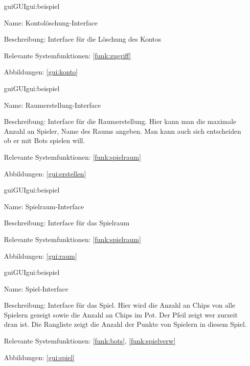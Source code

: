 \begin{description}[leftmargin=5em, style=sameline]	
	\begin{lhp}{gui}{GUI}{gui:beispiel}
		\item[Name:] Kontolöschung-Interface
		\item[Beschreibung:] Interface für die Löschung des Kontos
		\item[Relevante Systemfunktionen:] \ref{funk:zugriff}
		\item[Abbildungen:] \ref{gui:konto}
	\end{lhp}
\end{description}

\begin{description}[leftmargin=5em, style=sameline]	
	\begin{lhp}{gui}{GUI}{gui:beispiel}
		\item[Name:] Raumerstellung-Interface
		\item[Beschreibung:] Interface für die Raumerstellung. Hier kann man die maximale Anzahl an Spieler, Name des Raums angeben. Man kann auch sich entscheiden ob er mit Bots spielen will.
		\item[Relevante Systemfunktionen:] \ref{funk:spielraum}
		\item[Abbildungen:] \ref{gui:erstellen}
	\end{lhp}
\end{description}

\begin{description}[leftmargin=5em, style=sameline]	
	\begin{lhp}{gui}{GUI}{gui:beispiel}
		\item[Name:] Spielraum-Interface
		\item[Beschreibung:] Interface für das Spielraum
		\item[Relevante Systemfunktionen:] \ref{funk:spielraum}
		\item[Abbildungen:] \ref{gui:raum}
	\end{lhp}
\end{description}

\begin{description}[leftmargin=5em, style=sameline]	
	\begin{lhp}{gui}{GUI}{gui:beispiel}
		\item[Name:] Spiel-Interface
		\item[Beschreibung:] Interface für das Spiel. Hier wird die Anzahl an Chips von alle Spielern gezeigt sowie die Anzahl an Chips im Pot. Der Pfeil zeigt wer zurzeit dran ist. Die Rangliste zeigt die Anzahl der Punkte von Spielern in diesem Spiel.
		\item[Relevante Systemfunktionen:] \ref{funk:bots}, \ref{funk:spielverw}
		\item[Abbildungen:] \ref{gui:spiel}
	\end{lhp}
\end{description}

